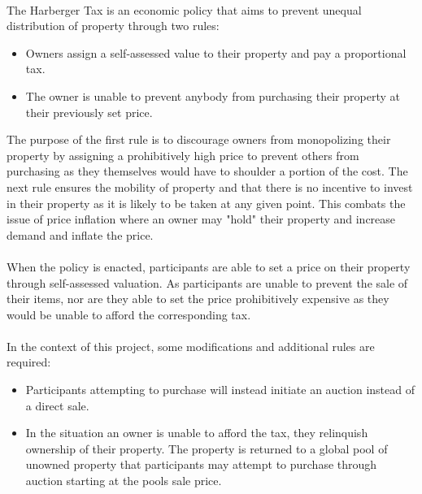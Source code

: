 \paragraph{} The Harberger Tax is an economic policy that aims to prevent unequal distribution of property through two rules:

\begin{itemize}
  \item Owners assign a self-assessed value to their property and pay a proportional tax.
  \item The owner is unable to prevent anybody from purchasing their property at their previously set price.
\end{itemize}

\noindent The purpose of the first rule is to discourage owners from monopolizing their property by assigning a prohibitively high price to prevent others from purchasing as they themselves would have to shoulder a portion of the cost. The next rule ensures the mobility of property and that there is no incentive to invest in their property as it is likely to be taken at any given point. This combats the issue of price inflation where an owner may "hold" their property and increase demand and inflate the price.

\paragraph{} When the policy is enacted, participants are able to set a price on their property through self-assessed valuation. As participants are unable to prevent the sale of their items, nor are they able to set the price prohibitively expensive as they would be unable to afford the corresponding tax.

\paragraph{} In the context of this project, some modifications and additional rules are required:

\begin{itemize}
  \item Participants attempting to purchase will instead initiate an auction instead of a direct sale.
  \item In the situation an owner is unable to afford the tax, they relinquish ownership of their property. The property is returned to a global pool of unowned property that participants may attempt to purchase through auction starting at the pools sale price.
\end{itemize}

